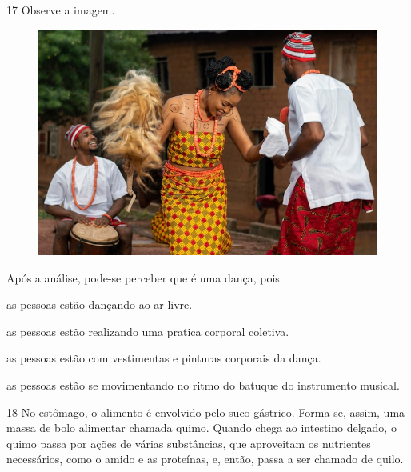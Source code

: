 \pagebreak
\num{17} Observe a imagem.
  \begin{figure}[htpb!]
\includegraphics[width=\textwidth]{./imgs/img15.jpg}
\end{figure}

\noindent{}Após a análise, pode-se perceber que é uma dança, pois

\begin{escolha}
\item as pessoas estão dançando ao ar livre.

\item as pessoas estão realizando uma pratica corporal coletiva.

\item as pessoas estão com vestimentas e pinturas corporais da dança.

\item as pessoas estão se movimentando no ritmo do batuque do instrumento
musical.
\end{escolha}


\pagebreak
\num{18} No estômago, o alimento é envolvido pelo suco gástrico.
Forma-se, assim, uma massa de bolo alimentar chamada quimo. Quando chega
ao intestino delgado, o quimo passa por ações de várias substâncias, que
aproveitam os nutrientes necessários, como o amido e as proteínas, e,
então, passa a ser chamado de quilo.

